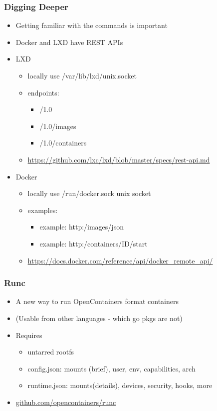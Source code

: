 \documentclass{beamer}
\begin{document}
\begin{frame}
\frametitle{Digging Deeper}
\begin{itemize}
  \item Getting familiar with the commands is important
  \item Docker and LXD have REST APIs

  \item LXD

    \begin{itemize}
      \item locally use /var/lib/lxd/unix.socket
      \item endpoints:
        \begin{itemize}
          \item /1.0
          \item /1.0/images
          \item /1.0/containers
        \end{itemize}
        \item \url{https://github.com/lxc/lxd/blob/master/specs/rest-api.md}
    \end{itemize}

  \item Docker

    \begin{itemize}
      \item locally use /run/docker.sock unix socket
      \item examples:
        \begin{itemize}
          \item example: http:/images/json
          \item example: http:/containers/ID/start
        \end{itemize}
      \item \url{https://docs.docker.com/reference/api/docker_remote_api/}
    \end{itemize}

\end{itemize}
\end{frame}

\begin{frame}
\frametitle{Runc}
\begin{itemize}
\item A new way to run OpenContainers format containers
\item (Usable from other languages - which go pkgs are not)
\item Requires
  \begin{itemize}
  \item untarred rootfs
  \item config.json: mounts (brief), user, env, capabilities, arch
  \item runtime.json: mounts(details), devices, security, hooks, more
  \end{itemize}
\item \url{github.com/opencontainers/runc}
\end{itemize}
\end{frame}
\end{document}
